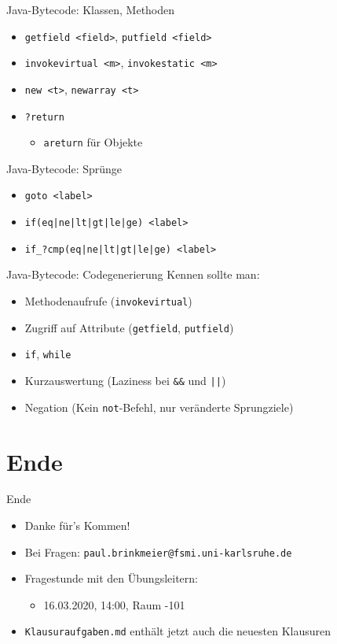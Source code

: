 \documentclass{beamer}
\begin{document}
\begin{frame}{Java-Bytecode: Klassen, Methoden}
	\begin{itemize}
		\item \texttt{getfield <field>}, \texttt{putfield <field>}
		\item \texttt{invokevirtual <m>}, \texttt{invokestatic <m>}
		\item \texttt{new <t>}, \texttt{newarray <t>}
		\item \texttt{?return}
		\begin{itemize}
			\item \texttt{areturn} für Objekte
		\end{itemize}
	\end{itemize}
\end{frame}

\begin{frame}{Java-Bytecode: Sprünge}
	\begin{itemize}
		\item \texttt{goto <label>}
		\item \texttt{if(eq|ne|lt|gt|le|ge) <label>}
		\item \texttt{if_?cmp(eq|ne|lt|gt|le|ge) <label>}
	\end{itemize}
\end{frame}

\begin{frame}{Java-Bytecode: Codegenerierung}
	Kennen sollte man:

	\begin{itemize}
		\item Methodenaufrufe (\texttt{invokevirtual})
		\item Zugriff auf Attribute (\texttt{getfield}, \texttt{putfield})
		\item \texttt{if}, \texttt{while}
		\item Kurzauswertung (Laziness bei \texttt{\&\&} und \texttt{\string|\string|})
		\item Negation (Kein \texttt{not}-Befehl, nur veränderte Sprungziele)
	\end{itemize}
\end{frame}

\section{Ende}

\begin{frame}{Ende}
	\begin{itemize}
		\item Danke für's Kommen!
		\item Bei Fragen: \texttt{paul.brinkmeier@fsmi.uni-karlsruhe.de}
		\item Fragestunde mit den Übungsleitern:
		\begin{itemize}
			\item 16.03.2020, 14:00, Raum -101
		\end{itemize}
		\item \texttt{Klausuraufgaben.md} enthält jetzt auch die neuesten Klausuren
	\end{itemize}
\end{frame}
\end{document}
